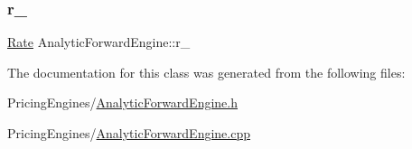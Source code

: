 \subsubsection{\texorpdfstring{r\+\_\+}{r\_}}
{\footnotesize\ttfamily \hyperlink{_name_def_8h_a25bee43a162de339c81f3d1caf6b887d}{Rate} Analytic\+Forward\+Engine\+::r\+\_\+\hspace{0.3cm}{\ttfamily [private]}}



The documentation for this class was generated from the following files\+:\begin{DoxyCompactItemize}
\item 
Pricing\+Engines/\hyperlink{_analytic_forward_engine_8h}{Analytic\+Forward\+Engine.\+h}\item 
Pricing\+Engines/\hyperlink{_analytic_forward_engine_8cpp}{Analytic\+Forward\+Engine.\+cpp}\end{DoxyCompactItemize}
